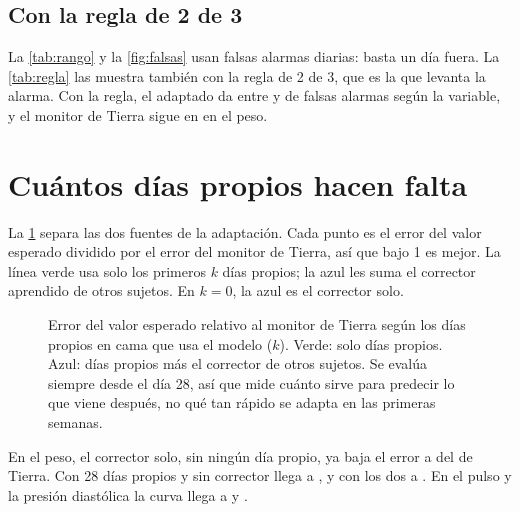 \subsection{Con la regla de 2 de 3}

La \cref{tab:rango} y la \cref{fig:falsas} usan falsas alarmas diarias: basta un día fuera. La \cref{tab:regla} las muestra
también con la regla de 2 de 3, que es la que levanta la alarma. Con la regla, el adaptado da entre
 y \pct{} de falsas alarmas según la variable, y el monitor de Tierra
sigue en \pct{} en el peso.

\begin{table}[htbp]
\caption[Falsas alarmas diarias y con la regla de 2 de 3]{Falsas alarmas (\%) diarias y con la regla de 2 de 3, desde
el día 28 en cama. La última columna es la detección del monitor de Tierra sin calibrar, alta solo porque alarma
mucho.}
\label{tab:regla}
\small

\end{table}

\section{Cuántos días propios hacen falta}\label{sec:curva}

La \cref{fig:curva} separa las dos fuentes de la adaptación. Cada punto es el error del valor esperado dividido por el
error del monitor de Tierra, así que bajo 1 es mejor. La línea verde usa solo los primeros $k$ días propios; la azul
les suma el corrector aprendido de otros sujetos. En $k = 0$, la azul es el corrector solo.

\begin{figure}[htbp]
\centering

\caption[Curva de aprendizaje del rango esperado]{Error del valor esperado relativo al monitor de Tierra según los días
propios en cama que usa el modelo ($k$). Verde: solo días propios. Azul: días propios más el corrector de otros
sujetos. Se evalúa siempre desde el día 28, así que mide cuánto sirve para predecir lo que viene después, no qué tan
rápido se adapta en las primeras semanas.}
\label{fig:curva}
\end{figure}

En el peso, el corrector solo, sin ningún día propio, ya baja el error a  del de Tierra. Con
28 días propios y sin corrector llega a , y con los dos a . En el
pulso y la presión diastólica la curva llega a  y .

